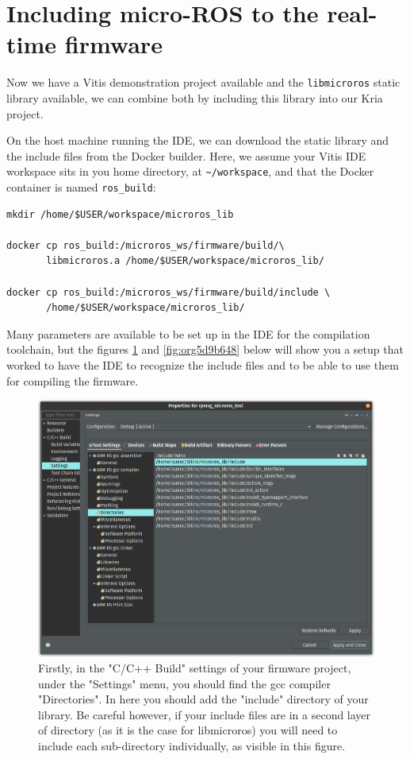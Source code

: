 \documentclass[10pt]{article}
\begin{document}
\section{Including micro-ROS to the real-time firmware}
\label{sec:org125e70a}
Now we have a Vitis demonstration project available and the \texttt{libmicroros} static library
available, we can combine both by including this library into our Kria project.

On the host machine running the IDE, we can download the static library
and the include files from the Docker builder.
Here, we assume your Vitis IDE workspace sits in you home directory, at \texttt{\textasciitilde{}/workspace},
and that the Docker container is named \texttt{ros\_build}:
\begin{verbatim}
mkdir /home/$USER/workspace/microros_lib

docker cp ros_build:/microros_ws/firmware/build/\
       libmicroros.a /home/$USER/workspace/microros_lib/

docker cp ros_build:/microros_ws/firmware/build/include \
       /home/$USER/workspace/microros_lib/
\end{verbatim}

Many parameters are available to be set up in the IDE for the compilation toolchain, but
the figures \ref{fig:orgc28c4c0} and \ref{fig:org5d9b648} below will show you a setup that worked to have the IDE
to recognize the include files and to be able to use them for compiling the firmware.

\begin{figure}[htbp]
\centering
\includegraphics[width=.8\textwidth]{./img/vitis_new/include.png}
\caption{\label{fig:orgc28c4c0}Firstly, in the "C/C++ Build" settings of your firmware project, under the "Settings" menu, you should find the gcc compiler "Directories". In here you should add the "include" directory of your library. Be careful however, if your include files are in a second layer of directory (as it is the case for libmicroros) you will need to include each sub-directory individually, as visible in this figure.}
\end{figure}
\end{document}
